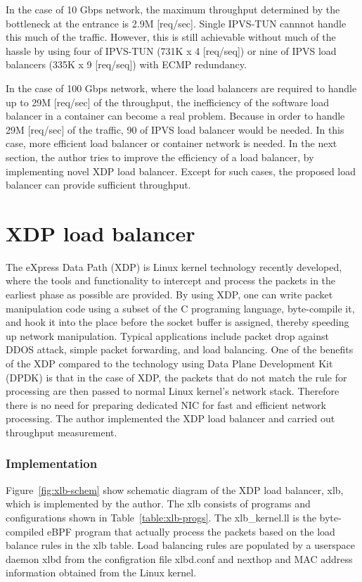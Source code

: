 In the case of 10 Gbps network, the maximum throughput determined by the bottleneck at the entrance is 2.9M [req/sec].
Single IPVS-TUN cannnot handle this much of the traffic.
However, this is still  achievable without much of the hassle by using four of IPVS-TUN (731K x 4 [req/seq]) or nine of IPVS load balancers (335K x 9 [req/seq]) with ECMP redundancy.

In the case of 100 Gbps network, where the load balancers are required to handle up to 29M [req/sec] of the throughput, the inefficiency of the software load balancer in a container can become a real problem.
Because in order to handle 29M [req/sec] of the traffic, 90 of IPVS load balancer would be needed.
In this case, more efficient load balancer or container network is needed.
In the next section, the author tries to improve the efficiency of a load balancer, by implementing novel XDP load balancer.
Except for such cases, the proposed load balancer can provide sufficient throughput.

\FloatBarrier

\section{XDP load balancer}

The eXpress Data Path (XDP) \cite{hoiland2018express} is Linux kernel technology recently developed, where the tools and functionality to intercept and process the packets in the earliest phase as possible are provided.
By using XDP, one can write packet manipulation code using a subset of the C programing language, byte-compile it, and hook it into the place before the socket buffer is assigned, thereby speeding up network manipulation.
Typical applications include packet drop against DDOS attack, simple packet forwarding, and load balancing.
One of the benefits of the XDP compared to the technology using Data Plane Development Kit (DPDK) \cite{dpdkorg} is that in the case of XDP, the packets that do not match the rule for processing are then passed to normal Linux kernel's network stack.
Therefore there is no need for preparing dedicated NIC for fast and efficient network processing.
The author implemented the XDP load balancer and carried out throughput measurement.

\subsubsection{Implementation}

Figure~\ref{fig:xlb-schem} show schematic diagram of the XDP load balancer, xlb, which is implemented by the author.
The xlb consists of programs and configurations shown in Table~\ref{table:xlb-progs}.
The xlb\_kernel.ll is the byte-compiled eBPF program that actually process the packets based on the load balance rules in the xlb table.
Load balancing rules are populated by a userspace daemon xlbd from the configration file xlbd.conf and nexthop and MAC address information obtained from the Linux kernel.

